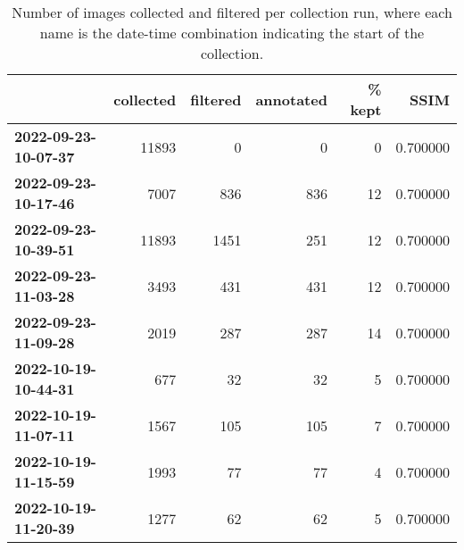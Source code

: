 \begin{table}[htbp]
\centering
\caption{Number of images collected and filtered per collection run, where each name is the date-time combination indicating the start of the collection.}
\label{tab:filtered_images}
\begin{tabular}{lrrrrr}
\toprule
 & \bfseries collected & \bfseries filtered & \bfseries annotated & \bfseries \% kept & \bfseries SSIM \\
\midrule
\bfseries 2022-09-23-10-07-37 & 11893 & 0 & 0 & 0 & 0.700000 \\
\bfseries 2022-09-23-10-17-46 & 7007 & 836 & 836 & 12 & 0.700000 \\
\bfseries 2022-09-23-10-39-51 & 11893 & 1451 & 251 & 12 & 0.700000 \\
\bfseries 2022-09-23-11-03-28 & 3493 & 431 & 431 & 12 & 0.700000 \\
\bfseries 2022-09-23-11-09-28 & 2019 & 287 & 287 & 14 & 0.700000 \\
\bfseries 2022-10-19-10-44-31 & 677 & 32 & 32 & 5 & 0.700000 \\
\bfseries 2022-10-19-11-07-11 & 1567 & 105 & 105 & 7 & 0.700000 \\
\bfseries 2022-10-19-11-15-59 & 1993 & 77 & 77 & 4 & 0.700000 \\
\bfseries 2022-10-19-11-20-39 & 1277 & 62 & 62 & 5 & 0.700000 \\
\bottomrule
\end{tabular}
\end{table}
